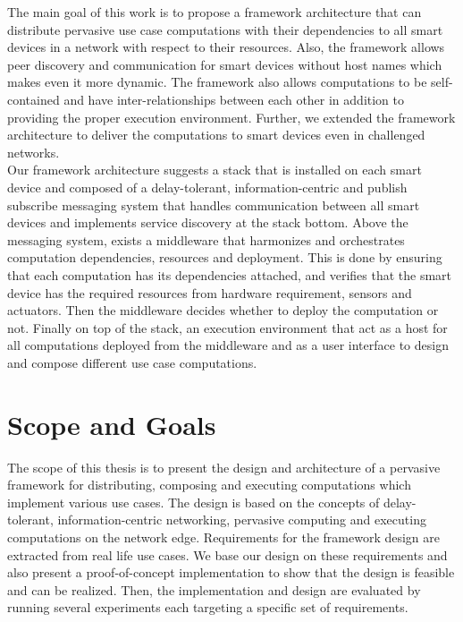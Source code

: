  \noindent The main goal of this work is to propose a framework architecture that can distribute  pervasive use case computations with their dependencies to all smart devices in a network with respect to their resources. Also, the framework allows peer discovery and communication for  smart devices without host names which makes even it more dynamic. The framework also allows computations to  be self-contained and have inter-relationships between each other in addition to providing the proper execution environment. Further, we extended the framework architecture to deliver the computations to smart devices even in challenged networks. \\
 
 \noindent Our framework architecture suggests a stack that is installed on each smart device
and composed of a delay-tolerant, information-centric and publish subscribe messaging
system that handles communication between all smart devices and implements
service discovery at the stack bottom. Above the messaging system, exists a middleware
that harmonizes and orchestrates computation dependencies, resources and
deployment. This is done by ensuring that each computation has its dependencies
attached, and verifies that the smart device has the required resources from hardware
requirement, sensors and actuators. Then the middleware decides whether to deploy
the computation or not. Finally on top of the stack, an execution environment that act
as a host for all computations deployed from the middleware and as a user interface to
design and compose different use case computations.
 
\section{Scope and Goals}
The scope of this thesis is to present the design and architecture of a pervasive  framework for distributing, composing and executing computations which implement various use cases. The design is based on the concepts of delay-tolerant, information-centric networking, pervasive computing and executing computations on the network edge. Requirements for the framework design are extracted from real life use cases. We base our design on these requirements and also present a proof-of-concept implementation to show that the design is feasible and can be realized. Then, the implementation and design are evaluated by running several experiments each targeting a specific set of requirements.\\

